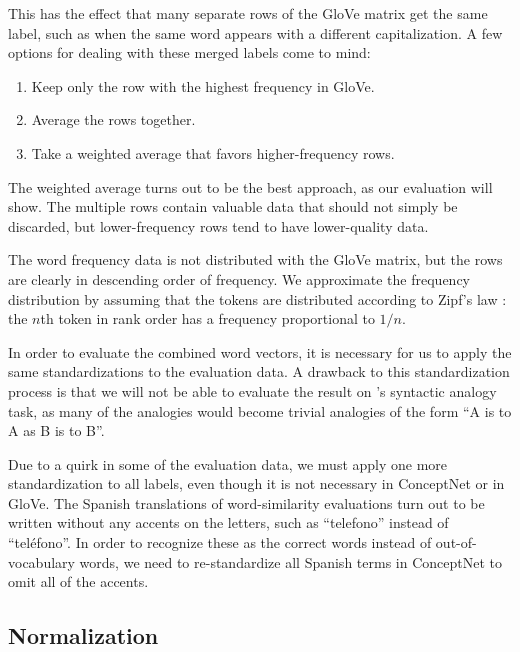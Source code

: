 \documentclass[11pt]{article}
\begin{document}
This has the effect that many separate rows of the GloVe matrix get the same
label, such as when the same word appears with a different capitalization. A
few options for dealing with these merged labels come to mind:

\begin{enumerate}
\item Keep only the row with the highest frequency in GloVe.
\item Average the rows together.
\item Take a weighted average that favors higher-frequency rows.
\end{enumerate}


The weighted average turns out to be the best approach, as our evaluation will
show. The multiple rows contain valuable data that should not simply be
discarded, but lower-frequency rows tend to have lower-quality data.

The word frequency data is not distributed with the GloVe matrix, but
the rows are clearly in descending order of frequency. We approximate the
frequency distribution by assuming that the tokens are distributed according to
Zipf's law \cite{zipf1949human}: the $n$th token in rank order has a frequency
proportional to $1/n$.

In order to evaluate the combined word vectors, it is necessary for us to apply
the same standardizations to the evaluation data. A drawback to this
standardization process is that we will not be able to evaluate the result on
's syntactic analogy task, as many of
the analogies would become trivial analogies of the form
``A is to A as B is to B''.

Due to a quirk in some of the evaluation data, we must apply one more
standardization to all labels, even though it is not necessary in ConceptNet or
in GloVe. The Spanish translations of word-similarity evaluations
\cite{hassan2009crosslingual} turn out to be written without any accents on the
letters, such as ``telefono'' instead of ``tel\'{e}fono''. In order to recognize
these as the correct words instead of out-of-vocabulary words, we need to
re-standardize all Spanish terms in ConceptNet to omit all of the accents.


\subsection{Normalization}
\end{document}
